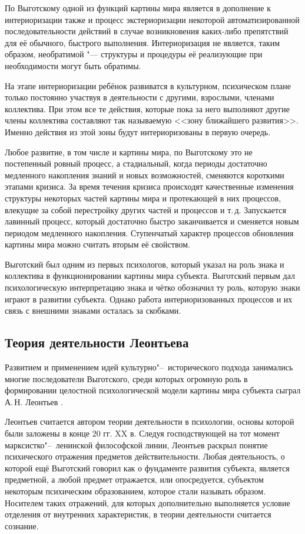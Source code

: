 По Выготскому одной из функций картины мира является в дополнение к интериоризации также и процесс экстериоризации некоторой автоматизированной последовательности действий в случае возникновения каких-либо препятствий для её обычного, быстрого выполнения. Интериоризация не является, таким образом, необратимой "--- структуры и процедуры её реализующие при необходимости могут быть обратимы.

На этапе интериоризации ребёнок развиватся в культурном, психическом плане только постоянно участвуя в деятельности с другими, взрослыми, членами коллектива. При этом все те действия, которые пока за него выполняют другие члены коллектива составляют так называемую <<зону ближайшего развития>>. Именно действия из этой зоны будут интериоризованы в первую очередь.

Любое развитие, в том числе и картины мира, по Выготскому это не постепенный ровный процесс, а стадиальный, когда периоды достаточно медленного накопления знаний и новых возможностей, сменяются короткими этапами кризиса. За время течения кризиса происходят качественные изменения структуры некоторых частей картины мира и протекающей в них процессов, влекущие за собой перестройку других частей и процессов и т.\,д. Запускается лавинный процесс, который достаточно быстро заканчивается и сменяется новым периодом медленного накопления. Ступенчатый характер процессов обновления картины мира можно считать вторым её свойством.

Выготский был одним из первых психологов, который указал на роль знака и коллектива в функционировании картины мира субъекта. Выготский первым дал психологическую интерпретацию знака и чётко обозначил ту роль, которую знаки играют в развитии субъекта. Однако работа интериоризованных процессов и их связь с внешними знаками осталась за скобками.

\subsection{Теория деятельности Леонтьева}

Развитием и применением идей культурно"--~исторического подхода занимались многие последователи Выготского, среди которых огромную роль в формировании целостной психологической модели картины мира субъекта сыграл А.\,Н. Леонтьев \cite{Leontiev1975}.

Леонтьев считается автором теории деятельности в психологии, основы которой были заложены в конце 20 гг. XX в. Следуя господствующей на тот момент марксистко"--~ленинской философской линии, Леонтьев раскрыл понятие психического отражения предметов действительности. Любая деятельность, о которой ещё Выготский говорил как о фундаменте развития субъекта, является предметной, а любой предмет отражается, или опосредуется, субъектом некоторым психическим образованием, которое стали называть образом. Носителем таких отражений, для которых дополнительно выполняется условие отделения от внутренних характеристик, в теории деятельности считается сознание.

